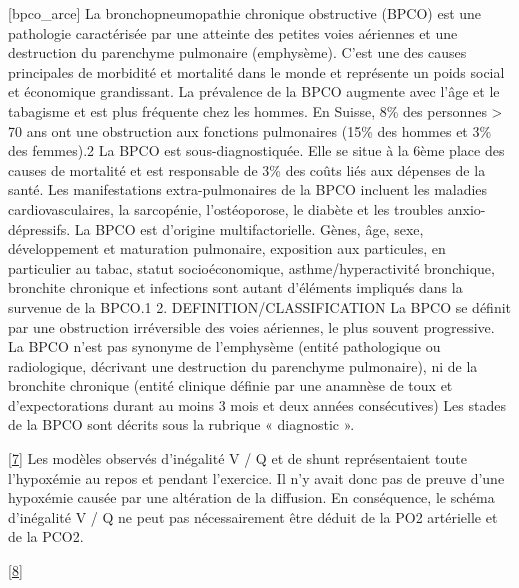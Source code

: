 \documentclass[12pt,]{article}
\begin{document}
{[}bpco\_arce{]} La bronchopneumopathie chronique obstructive (BPCO) est
une pathologie caractérisée par une atteinte des petites voies aériennes
et une destruction du parenchyme pulmonaire (emphysème). C'est une des
causes principales de morbidité et mortalité dans le monde et représente
un poids social et économique grandissant. La prévalence de la BPCO
augmente avec l'âge et le tabagisme et est plus fréquente chez les
hommes. En Suisse, 8\% des personnes \textgreater{} 70 ans ont une
obstruction aux fonctions pulmonaires (15\% des hommes et 3\% des
femmes).2 La BPCO est sous-diagnostiquée. Elle se situe à la 6ème place
des causes de mortalité et est responsable de 3\% des coûts liés aux
dépenses de la santé. Les manifestations extra-pulmonaires de la BPCO
incluent les maladies cardiovasculaires, la sarcopénie, l'ostéoporose,
le diabète et les troubles anxio- dépressifs. La BPCO est d'origine
multifactorielle. Gènes, âge, sexe, développement et maturation
pulmonaire, exposition aux particules, en particulier au tabac, statut
socioéconomique, asthme/hyperactivité bronchique, bronchite chronique et
infections sont autant d'éléments impliqués dans la survenue de la
BPCO.1 2. DEFINITION/CLASSIFICATION La BPCO se définit par une
obstruction irréversible des voies aériennes, le plus souvent
progressive. La BPCO n'est pas synonyme de l'emphysème (entité
pathologique ou radiologique, décrivant une destruction du parenchyme
pulmonaire), ni de la bronchite chronique (entité clinique définie par
une anamnèse de toux et d'expectorations durant au moins 3 mois et deux
années consécutives) Les stades de la BPCO sont décrits sous la rubrique
« diagnostic ».

{[}\protect\hyperlink{ref-wagner1977ventilation}{7}{]} Les modèles
observés d'inégalité V / Q et de shunt représentaient toute l'hypoxémie
au repos et pendant l'exercice. Il n'y avait donc pas de preuve d'une
hypoxémie causée par une altération de la diffusion. En conséquence, le
schéma d'inégalité V / Q ne peut pas nécessairement être déduit de la
PO2 artérielle et de la PCO2.

{[}\protect\hyperlink{ref-mcdonough2011small}{8}{]}
\end{document}
